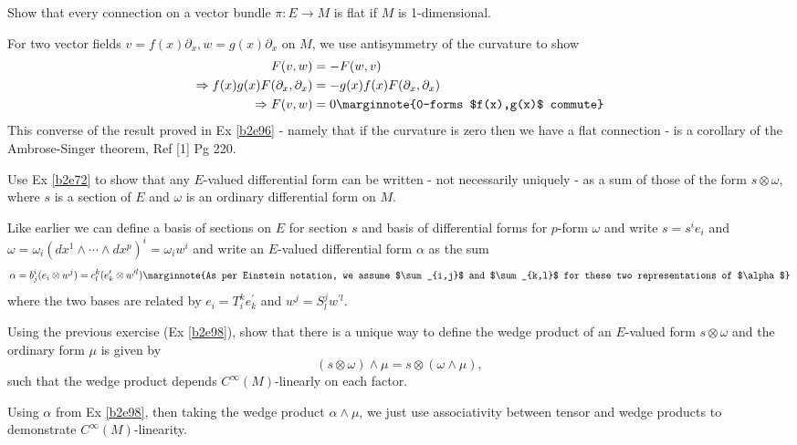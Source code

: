 \documentclass[10pt]{article}
\begin{document}
\begin{example}
	Show that every connection on a vector bundle $\pi:E\to M$ is flat if $M$ is 1-dimensional.
\end{example}
\sol For two vector fields $v=f(x)\partial_x,w=g(x)\partial_x$ on $M$, we use antisymmetry of the curvature to show
$$
\begin{aligned}
	F(v,w) &= -F(w,v)\\
	\Rightarrow f(x)g(x)F(\partial_x,\partial_x) &= -g(x)f(x)F(\partial_x,\partial_x)\\
	\Rightarrow F(v,w) &= 0\marginnote{0-forms $f(x),g(x)$ commute}
\end{aligned}
$$
This converse of the result proved in Ex \ref{b2e96} - namely that if the curvature is zero then we have a flat connection - is a corollary of the Ambrose-Singer theorem, Ref [1] Pg 220.


\begin{example}\label{b2e98}
	Use Ex \ref{b2e72} to show that any $E$-valued differential form can be written - not necessarily uniquely - as a sum of those of the form $s\otimes \omega$, where $s$ is a section of $E$ and $\omega$ is an ordinary differential form on $M$.
\end{example}
\sol Like earlier we can define a basis of sections on $E$ for section $s$ and basis of differential forms for $p$-form $\omega$ and write $s=s^ie_i$ and $\omega=\omega_i (dx^1\wedge\cdots\wedge dx^p)^i = \omega_i w^i$ and write an $E$-valued differential form $\alpha$ as the sum
$$
\alpha = b_j^i (e_i \otimes w^j) = c_l^k (e_k^\prime \otimes w^{\prime l}) \marginnote{As per Einstein notation, we assume $\sum_{i,j}$ and $\sum_{k,l}$ for these two representations of $\alpha$}
$$
where the two bases are related by $e_i = T_i^k e_k^\prime$ and $w^j = S_l^j w^{\prime l}$.


\begin{example}\label{b2e99}
	Using the previous exercise (Ex \ref{b2e98}), show that there is a unique way to define the wedge product of an $E$-valued form $s\otimes \omega$ and the ordinary form $\mu$ is given by
	$$
	(s\otimes \omega) \wedge \mu = s\otimes (\omega \wedge \mu),
	$$
	such that the wedge product depends $C^\infty(M)$-linearly on each factor.
\end{example}
\sol Using $\alpha$ from Ex \ref{b2e98}, then taking the wedge product $\alpha \wedge \mu$, we just use associativity between tensor and wedge products to demonstrate $C^\infty(M)$-linearity.
\end{document}
